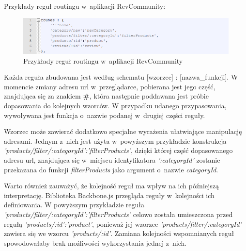 Przykłady reguł routingu w~aplikacji RevCommunity:

\begin{figure}[H]
	\centering
	\includegraphics[width=\textwidth]{images/routes.png}
	\caption{Przykłady reguł routingu w~aplikacji RevCommunity}
\end{figure}

Każda reguła zbudowana jest według schematu [wzorzec] : [nazwa\_funkcji]. W momencie zmiany adresu url w~przeglądarce, pobierana jest jego część, znajdująca się za znakiem \textbf{\#}, która następnie poddawana jest próbie dopasowania do kolejnych wzorców. W przypadku udanego przypasowania, wywoływana jest funkcja o~nazwie podanej w~drugiej części reguły.

Wzorzec może zawierać dodatkowo specjalne wyrażenia ułatwiające manipulację adresami. Jednym z~nich jest użyta w~powyższym przykładzie konstrukcja \textit{'products/filter/:categoryId':'filterProducts'}, dzięki której część dopasowanego adresu url, znajdująca się w~miejscu identyfikatora \textit{':categoryId'} zostanie przekazana do funkcji \textit{filterProducts} jako argument o~nazwie \textit{categoryId}.

Warto również zauważyć, że kolejność reguł ma wpływ na ich późniejszą interpretację. Biblioteka Backbone.js przegląda reguły w~kolejności ich definiowania. W powyższym przykładzie reguła \textit{'products/filter/:categoryId':'filterProducts'} celowo została umieszczona przed regułą \textit{'products/:id':'product'}, ponieważ jej wzorzec \textit{'products/filter/:categoryId'} zawiera się we wzorcu \textit{'products/:id'}. Zamiana kolejności wspomnianych reguł spowodowałaby brak możliwości wykorzystania jednej z~nich.\cite{backbone}